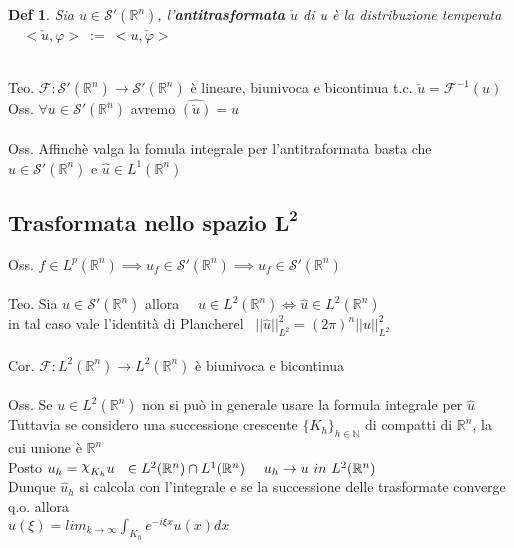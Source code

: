 \documentclass{article}
\theoremstyle{unnumbered}
\newtheorem* {theoremT}{Def}
\theoremstyle{unnumbered1}
\newenvironment{defi}{\begin{gBox}\begin{theoremT}}{\end{theoremT}\end{gBox}}
\DeclareRobustCommand{\Chi}{{\mathpalette\irchi\relax}}
\newcommand{\irchi}[2]{\raisebox{\depth}{$#1\chi$}} %
\renewcommand{\phi}{\varphi}
\renewcommand{\hat}{\widehat}
\begin{document}
\begin{defi}
Sia $u\in\mathcal{S}'(\mathbb{R}^n)$, l'\textbf{antitrasformata} $\check{u}$ di u è la distribuzione temperata \ \ $<\check{u},\phi> \ := \ <u,\check{\phi}>$
\end{defi}
\phantom{}\\
%
%
%
Teo. $\mathcal{F}:\mathcal{S}'(\mathbb{R}^n)\to\mathcal{S}'(\mathbb{R}^n)$ è lineare, biunivoca e bicontinua t.c. $\check{u}=\mathcal{F}^{-1}(u)$ \\ 
%
Oss. $\forall u\in\mathcal{S}'(\mathbb{R}^n)$ avremo $\widehat{(\check{u})}=u$\\ \\
%
%
Oss. Affinchè valga la fomula integrale per l'antitraformata basta che $u\in\mathcal{S}'(\mathbb{R}^n)$ e $\hat{u}\in L^1(\mathbb{R}^n)$\\



\subsection{Trasformata nello spazio $\mathbf{L^2}$}
%
Oss. $f\in L^p(\mathbb{R}^n) \implies u_f\in\mathcal{S}'(\mathbb{R}^n) \implies \hat{u}_f\in\mathcal{S}'(\mathbb{R}^n)$\\ \\
%
Teo. Sia $u\in\mathcal{S}'(\mathbb{R}^n)$ allora \ \ $u\in L^2(\mathbb{R}^n)\Longleftrightarrow \hat{u}\in L^2(\mathbb{R}^n)$ \\ in tal caso vale l'identità di Plancherel \ $||\hat{u}||^2_{L^2} = (2\pi)^n||u||^2_{L^2}$\\ \\
%
Cor. $\mathcal{F}:L^2(\mathbb{R}^n)\to L^2(\mathbb{R}^n)$ è biunivoca e bicontinua\\ \\
%
%
Oss. Se $u\in L^2(\mathbb{R}^n)$ non si può in generale usare la formula integrale per $\hat{u}$\\
Tuttavia se considero una successione crescente $\{K_h\}_{h\in\mathbb{N}}$ di compatti di $\mathbb{R}^n$, la cui unione è $\mathbb{R}^n$\\
Posto $u_h=\Chi_{K_h}u \ \ \in L^2(\mathbb{R}^n)\cap L^1(\mathbb{R}^n) \ \ \ \ u_h \to u \ in \ L^2(\mathbb{R}^n)$\\
Dunque $\hat{u}_h$ si calcola con l'integrale e se la successione delle trasformate converge q.o. \!\!\! allora\\ $\hat{u}(\xi)=lim_{k\to\infty}\int_{K_h}e^{-i\xi x}u(x) dx$\\ \\ \\ %
\end{document}
